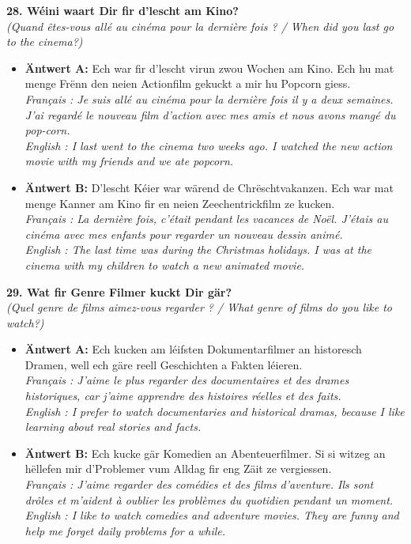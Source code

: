 \noindent\textbf{28. Wéini waart Dir fir d’lescht am Kino?}\\
\textit{(Quand êtes-vous allé au cinéma pour la dernière fois ? / When did you last go to the cinema?)}
\begin{itemize}
    \item \textbf{Äntwert A:} Ech war fir d'lescht virun zwou Wochen am Kino. Ech hu mat menge Frënn den neien Actionfilm gekuckt a mir hu Popcorn giess.\\
    \textit{Français : Je suis allé au cinéma pour la dernière fois il y a deux semaines. J'ai regardé le nouveau film d'action avec mes amis et nous avons mangé du pop-corn.}\\
    \textit{English : I last went to the cinema two weeks ago. I watched the new action movie with my friends and we ate popcorn.}
    \item \textbf{Äntwert B:} D'lescht Kéier war wärend de Chrëschtvakanzen. Ech war mat menge Kanner am Kino fir en neien Zeechentrickfilm ze kucken.\\
    \textit{Français : La dernière fois, c'était pendant les vacances de Noël. J'étais au cinéma avec mes enfants pour regarder un nouveau dessin animé.}\\
    \textit{English : The last time was during the Christmas holidays. I was at the cinema with my children to watch a new animated movie.}
\end{itemize}
\vspace{0.5em}

\noindent\textbf{29. Wat fir Genre Filmer kuckt Dir gär?}\\
\textit{(Quel genre de films aimez-vous regarder ? / What genre of films do you like to watch?)}
\begin{itemize}
    \item \textbf{Äntwert A:} Ech kucken am léifsten Dokumentarfilmer an historesch Dramen, well ech gäre reell Geschichten a Fakten léieren.\\
    \textit{Français : J'aime le plus regarder des documentaires et des drames historiques, car j'aime apprendre des histoires réelles et des faits.}\\
    \textit{English : I prefer to watch documentaries and historical dramas, because I like learning about real stories and facts.}
    \item \textbf{Äntwert B:} Ech kucke gär Komedien an Abenteuerfilmer. Si si witzeg an hëllefen mir d'Problemer vum Alldag fir eng Zäit ze vergiessen.\\
    \textit{Français : J'aime regarder des comédies et des films d'aventure. Ils sont drôles et m'aident à oublier les problèmes du quotidien pendant un moment.}\\
    \textit{English : I like to watch comedies and adventure movies. They are funny and help me forget daily problems for a while.}
\end{itemize}
\vspace{0.5em}

